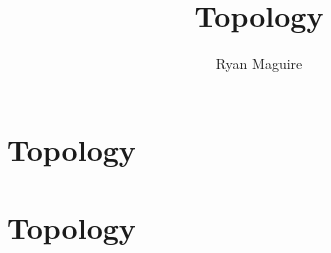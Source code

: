 \documentclass[crop=false,class=book,oneside]{standalone}
\begin{document}
\ifx\ifmath\undefined
    \title{Topology}
    \author{Ryan Maguire}
    \date{\vspace{-5ex}}
    \maketitle
    \tableofcontents
    \chapter*{Topology}
    \setcounter{chapter}{1}
\else
    \chapter{Topology}
\fi
\end{document}
